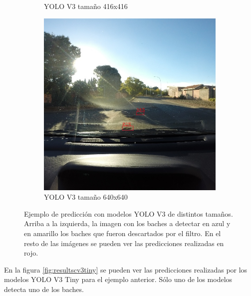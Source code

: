 \begin{figure}[H]
\begin{subfigure}[h]{0.45\linewidth}
		\caption{YOLO V3 tamaño 416x416}
	\end{subfigure}
	\begin{subfigure}[h]{0.45\linewidth}
		\includegraphics[width=\linewidth]{images/results_c_yolo_v3_640.jpg}
		\caption{YOLO V3 tamaño 640x640}
	\end{subfigure}
	\caption{Ejemplo de predicción con modelos YOLO V3 de distintos tamaños. Arriba a la izquierda, la imagen con los baches a detectar en azul y en amarillo los baches que fueron descartados por el filtro. En el resto de las imágenes se pueden ver las predicciones realizadas en rojo.}
	\label{fig:resultscv3}
\end{figure}

En la figura \ref{fig:resultscv3tiny} se pueden ver las predicciones realizadas por los modelos YOLO V3 Tiny para el ejemplo anterior. Sólo uno de los modelos detecta uno de los baches.

